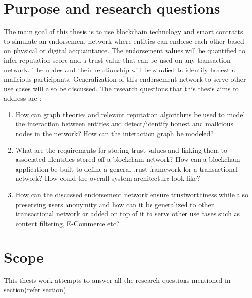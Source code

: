 
\section{Purpose and research questions}
The main goal of this thesis is to use blockchain technology and 
smart contracts to simulate an endorsement network where entities can 
endorse each other based on physical or digital acquaintance. The 
endorsement values will be quantified to infer reputation score and 
a trust value that can be used on any transaction network. The nodes and 
their relationship will be studied to identify honest or malicious 
participants. Generalization of this endorsement network to serve 
other use cases will also be discussed. 
The research questions that this thesis aims to address are : 
\begin{enumerate}
\item How can graph theories and relevant reputation algorithms be used 
to model the interaction between entities and detect/identify honest 
and malicious nodes in the network? How can the interaction graph be
modeled?
\item What are the requirements for storing trust values and linking 
them to associated identities stored off a blockchain network? How can a blockchain application be built to define a general trust framework for 
a transactional network? How could the overall system architecture look like? 
\item How can the discussed endorsement network ensure trustworthiness
while also preserving users anonymity and how can it be generalized to
other transactional network or added on top of it to serve other use 
cases such as content filtering, E-Commerce etc? 
\end{enumerate}


\section{Scope} 
This thesis work attempts to answer all the research questions mentioned
in section(refer section).
 
